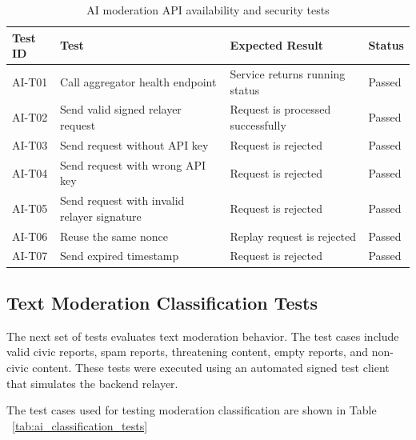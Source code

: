 \begin{table}[h!]
\centering
\caption{AI moderation API availability and security tests}
\begin{tabular}{|p{2cm}|p{5cm}|p{5cm}|p{2cm}|}
\hline
\textbf{Test ID} & \textbf{Test} & \textbf{Expected Result} & \textbf{Status} \\
\hline
AI-T01 & Call aggregator health endpoint & Service returns running status & Passed \\
\hline
AI-T02 & Send valid signed relayer request & Request is processed successfully & Passed \\
\hline
AI-T03 & Send request without API key & Request is rejected & Passed \\
\hline
AI-T04 & Send request with wrong API key & Request is rejected & Passed \\
\hline
AI-T05 & Send request with invalid relayer signature & Request is rejected & Passed \\
\hline
AI-T06 & Reuse the same nonce & Replay request is rejected & Passed \\
\hline
AI-T07 & Send expired timestamp & Request is rejected & Passed \\
\hline
\end{tabular}
\label{tab:ai_api_tests}
\end{table}

\subsection{Text Moderation Classification Tests}

The next set of tests evaluates text moderation behavior. The test cases include
valid civic reports, spam reports, threatening content, empty reports, and non-civic
content. These tests were executed using an automated signed test client that
simulates the backend relayer.

The test cases used for testing moderation classification are shown in Table ~\ref{tab:ai_classification_tests}

